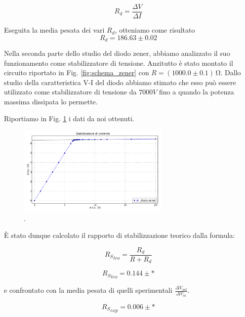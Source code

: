 \begin{equation}
R_d=\frac{\Delta V}{\Delta I}
\label{scemopagliaccio}
\end{equation}

Eseguita la media pesata dei vari $R_d$, otteniamo come risultato
$$R_d= 186.63 \pm 0.02$$

Nella seconda parte dello studio del diodo zener, abbiamo analizzato il suo funzionamento come stabilizzatore di tensione. Anzitutto è stato montato il circuito riportato in Fig. \ref{fig:schema_zener} con $R = (1000.0 \pm 0.1) \, \si{\ohm}$.  Dallo studio della caratteristica V-I del diodo abbiamo stimato che esso può essere utilizzato come stabilizzatore di tensione da $7000 V$ fino a quando la potenza massima dissipata lo permette. 

Riportiamo in Fig. \ref{fig:stabilizer} i dati da noi ottenuti.

\begin{figure}[h]
\center
	\includegraphics[width=0.66\textwidth]{stabilizer.pdf}
	\caption{.}
	\label{fig:stabilizer}
\end{figure}

\`E stato dunque calcolato il rapporto di stabilizzazione teorico dalla formula: 

\begin{equation}
{R_S}_{teo}=\frac{R_d}{R+R_d}
\label{RS_teo}
\end{equation}

$${R_S}_{teo}= 0.144 \pm *$$

e confrontato con la media pesata di quelli sperimentali $\frac{\Delta V_{out}}{\Delta V_{in}}$.

$${R_S}_{exp}= 0.006 \pm *$$
 